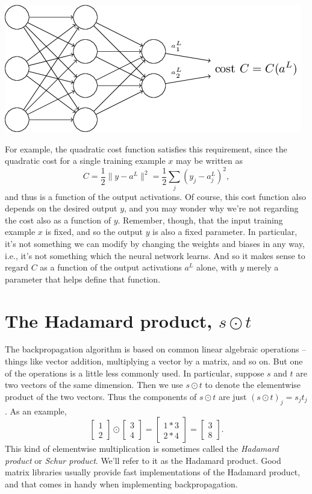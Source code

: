 \documentclass[a4paper,twoside,10pt]{book}
\begin{document}
\begin{center}
\includegraphics[width=0.7\linewidth]{./figures/ch2/tikz18}
\end{center}
For example, the quadratic cost function satisfies this requirement, since the quadratic cost for a single training example $x$ may be written as
\begin{equation}
C = \frac{1}{2} \|y-a^L\|^2 = \frac{1}{2} \sum_j (y_j-a^L_j)^2,
\label{eq:27}
\end{equation}
and thus is a function of the output activations. Of course, this cost function also depends on the desired output $y$, and you may wonder why we're not regarding the cost also as a function of $y$. Remember, though, that the input training example $x$ is fixed, and so the output $y$ is also a fixed parameter. In particular, it's not something we can modify by changing the weights and biases in any way, i.e., it's not something which the neural network learns. And so it makes sense to regard $C$ as a function of the output activations $a^L$ alone, with $y$ merely a parameter that helps define that function.
\section{The Hadamard product, $s\odot{}t$}
The backpropagation algorithm is based on common linear algebraic operations -- things like vector addition, multiplying a vector by a matrix, and so on. But one of the operations is a little less commonly used. In particular, suppose $s$ and $t$ are two vectors of the same dimension. Then we use $s\odot{}t$ to denote the elementwise product of the two vectors. Thus the components of $s\odot{}t$ are just $(s \odot t)_j = s_j t_j$. As an example,
\begin{equation}
	\left[\begin{array}{c} 1 \\ 2 \end{array}\right] 
	\odot \left[\begin{array}{c} 3 \\ 4\end{array} \right]
	= \left[ \begin{array}{c} 1 * 3 \\ 2 * 4 \end{array} \right]
	= \left[ \begin{array}{c} 3 \\ 8 \end{array} \right].
	\label{eq:28}
\end{equation}
This kind of elementwise multiplication is sometimes called the \textit{Hadamard product} or \textit{Schur product}. We'll refer to it as the Hadamard product. Good matrix libraries usually provide fast implementations of the Hadamard product, and that comes in handy when implementing backpropagation.
\end{document}
